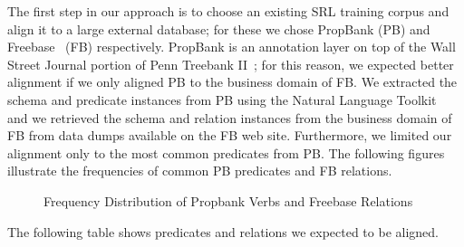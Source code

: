 The first step in our approach is to choose an existing SRL training corpus and align it to a large external database; for these we chose PropBank (PB) and Freebase~\cite{bollacker_freebase:_2008} (FB) respectively.
PropBank is an annotation layer on top of the Wall Street Journal portion of Penn Treebank II~\cite{marcus_building_1993}; for this reason, we expected better alignment if we only aligned PB to the business domain of FB.
We extracted the schema and predicate instances from PB using the Natural Language Toolkit~\cite{bird_nltk:_2006} and we retrieved the schema and relation instances from the business domain of FB from data dumps available on the FB web site.
Furthermore, we limited our alignment only to the most common predicates from PB.  The following figures illustrate the frequencies of common PB predicates and FB relations.

\begin{figure} [ht]
\begin{center}
\caption{Frequency Distribution of Propbank Verbs and Freebase Relations}
\vspace{-0.5cm}
\label{fig:figure1}
\end{center}
\end{figure}



The following table shows predicates and relations we expected to be aligned.

